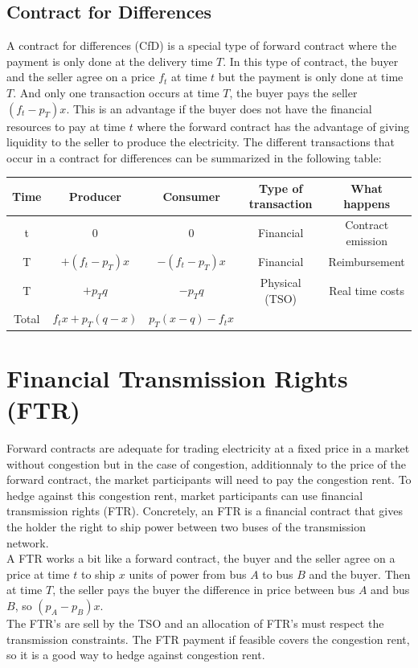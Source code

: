 \documentclass[12pt, openany]{report}
\theoremstyle{definition}
\begin{document}
\subsection{Contract for Differences}
A contract for differences (CfD) is a special type of forward contract where the payment is only done at the delivery time $T$. In this type of contract, the buyer and the seller agree on a price $f_t$ at time $t$ but the payment is only done at time $T$. And only one transaction occurs at time $T$, the buyer pays the seller $(f_t - p_T) x$. This is an advantage if the buyer does not have the financial resources to pay at time $t$ where the forward contract has the advantage of giving liquidity to the seller to produce the electricity. The different transactions that occur in a contract for differences can be summarized in the following table:
\begin{center}
    \begin{tabular}{|c|c|c|c|c|}
        \hline
        Time & Producer & Consumer & Type of transaction & What happens\\
        \hline
        t &  $0$ & $0$ & Financial & Contract emission\\
        \hline
        T & $+(f_t-p_T) x$ & $-(f_t-p_T) x$ & Financial & Reimbursement\\
        \hline
        T & $+p_T q$ & $-p_T q$ & Physical (TSO) & Real time costs\\
        \hline
        \hline
        Total & $f_t x + p_T (q - x)$ & $p_T (x - q) - f_t x$ & & \\
        \hline
    \end{tabular}
\end{center}
\section{Financial Transmission Rights (FTR)}
Forward contracts are adequate for trading electricity at a fixed price in a market without congestion but in the case of congestion, additionnaly to the price of the forward contract, the market participants will need to pay the congestion rent. To hedge against this congestion rent, market participants can use financial transmission rights (FTR). Concretely, an FTR is a financial contract that gives the holder the right to ship power between two buses of the transmission network.\\
A FTR works a bit like a forward contract, the buyer and the seller agree on a price at time $t$ to ship $x$ units of power from bus $A$ to bus $B$ and the buyer. Then at time $T$, the seller pays the buyer the difference in price between bus $A$ and bus $B$, so $(p_A - p_B) x$.\\
The FTR's are sell by the TSO and an allocation of FTR's must respect the transmission constraints. The FTR payment if feasible covers the congestion rent, so it is a good way to hedge against congestion rent. 
\end{document}
